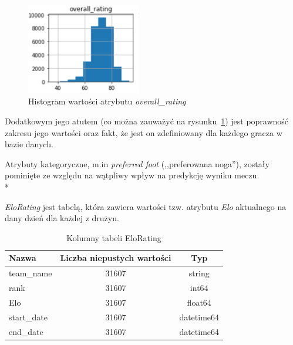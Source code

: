     \begin{figure}[H] 
        \centering\includegraphics[width=5cm]{figures/overall_rating.png}
        \caption{Histogram wartości atrybutu \emph{overall\_rating}}
        \label{fig:overall_rating}
    \end{figure}
    
    \noindent Dodatkowym jego atutem (co można zauważyć na rysunku~\ref{fig:overall_rating}) jest poprawność zakresu jego wartości oraz fakt, że jest on zdefiniowany dla każdego gracza w bazie danych.
    
    Atrybuty kategoryczne, m.in \emph{preferred foot} (,,preferowana noga''), zostały pominięte ze względu na wątpliwy wpływ na predykcję wyniku meczu. \\*
    
    \noindent \emph{EloRating} jest tabelą, która zawiera wartości tzw. atrybutu \emph{Elo} aktualnego na dany dzień dla każdej z drużyn.
    
    \begin{table}[H]
    \caption{Kolumny tabeli EloRating}\label{tab:elo}
    \centering\footnotesize%
    \begin{tabular}{l c c}
    \toprule
        Nazwa & Liczba niepustych wartości & Typ \\
    \midrule
        team\_name & 31607 & string \\
        rank & 31607 & int64 \\
        Elo & 31607 & float64 \\
        start\_date & 31607 & datetime64 \\
        end\_date & 31607 & datetime64 \\
    \bottomrule
    \end{tabular}
    \end{table}
    
